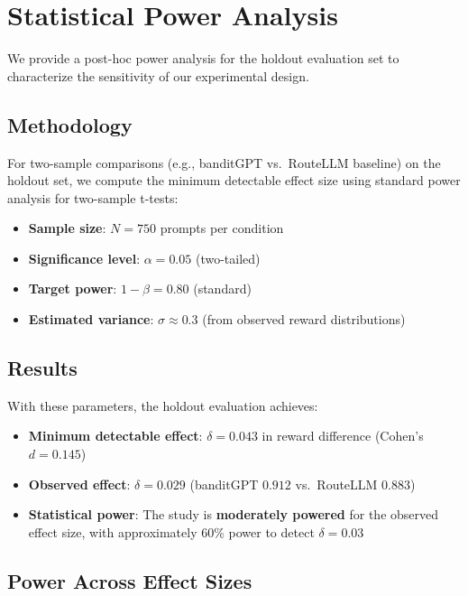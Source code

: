 \section{Statistical Power Analysis}
\label{app:power}

We provide a post-hoc power analysis for the holdout evaluation set to characterize the sensitivity of our experimental design.

\subsection{Methodology}

For two-sample comparisons (e.g., banditGPT vs.\ RouteLLM baseline) on the holdout set, we compute the minimum detectable effect size using standard power analysis for two-sample t-tests:

\begin{itemize}
    \item \textbf{Sample size}: $N=750$ prompts per condition
    \item \textbf{Significance level}: $\alpha = 0.05$ (two-tailed)
    \item \textbf{Target power}: $1-\beta = 0.80$ (standard)
    \item \textbf{Estimated variance}: $\sigma \approx 0.3$ (from observed reward distributions)
\end{itemize}

\subsection{Results}

With these parameters, the holdout evaluation achieves:

\begin{itemize}
    \item \textbf{Minimum detectable effect}: $\delta = 0.043$ in reward difference (Cohen's $d = 0.145$)
    \item \textbf{Observed effect}: $\delta = 0.029$ (banditGPT $0.912$ vs.\ RouteLLM $0.883$)
    \item \textbf{Statistical power}: The study is \textbf{moderately powered} for the observed effect size, with approximately 60\% power to detect $\delta = 0.03$
\end{itemize}

\subsection{Power Across Effect Sizes}

